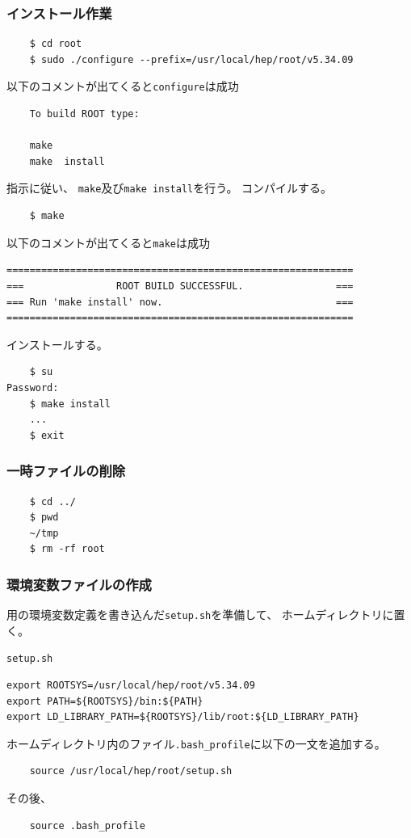 \documentclass{jarticle}
\begin{document}
   \subsubsection*{インストール作業}
\begin{verbatim}
	$ cd root
	$ sudo ./configure --prefix=/usr/local/hep/root/v5.34.09
\end{verbatim}
以下のコメントが出てくると\texttt{configure}は成功
\begin{verbatim}
	To build ROOT type:

	make
	make  install
\end{verbatim}
指示に従い、
\verb|make|及び\verb|make install|を行う。
コンパイルする。
\begin{verbatim}
	$ make
\end{verbatim}
以下のコメントが出てくると\texttt{make}は成功
\begin{verbatim}
============================================================
===                ROOT BUILD SUCCESSFUL.                ===
=== Run 'make install' now.                              ===
============================================================
\end{verbatim}
インストールする。
\begin{verbatim}
	$ su
Password:
	$ make install
	...
	$ exit
\end{verbatim}


\subsubsection*{一時ファイルの削除}
\begin{verbatim}
	$ cd ../
	$ pwd
	~/tmp
	$ rm -rf root
\end{verbatim}


\subsubsection*{環境変数ファイルの作成}
\ROOT 用の環境変数定義を書き込んだ\verb|setup.sh|を準備して、
ホームディレクトリに置く。
\begin{itembox}{\texttt{setup.sh}}
\begin{verbatim}
export ROOTSYS=/usr/local/hep/root/v5.34.09
export PATH=${ROOTSYS}/bin:${PATH} 
export LD_LIBRARY_PATH=${ROOTSYS}/lib/root:${LD_LIBRARY_PATH}
\end{verbatim}
\end{itembox}
ホームディレクトリ内のファイル\verb|.bash_profile|に以下の一文を追加する。
\begin{verbatim}
	source /usr/local/hep/root/setup.sh
\end{verbatim}
その後、
\begin{verbatim}
	source .bash_profile
\end{verbatim}
\end{document}
